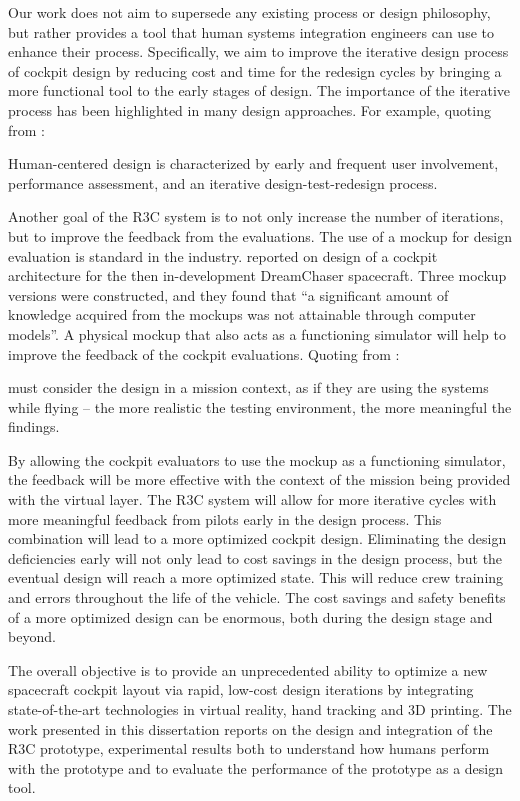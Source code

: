 Our work does not aim to supersede any existing process or design philosophy, but rather provides a tool that human systems integration engineers can use to enhance their process.
Specifically, we aim to improve the iterative design process of cockpit design by reducing cost and time for the redesign cycles by bringing a more functional tool to the early stages of design.
The importance of the iterative process has been highlighted in many design approaches.
For example, quoting from \citet{nasa_nasa_2015}:
\begin{displayquote}
Human-centered design \textelp is characterized by early and frequent user involvement, performance assessment, and an iterative design-test-redesign process.
\end{displayquote}
Another goal of the R3C system is to not only increase the number of iterations, but to improve the feedback from the evaluations.
The use of a mockup for design evaluation is standard in the industry.
\citet{zea_development_2012} reported on design of a cockpit architecture for the then in-development DreamChaser spacecraft.
Three mockup versions were constructed, and they found that ``a significant amount of knowledge acquired from the mockups was not attainable through computer models''.
A physical mockup that also acts as a functioning simulator will help to improve the feedback of the cockpit evaluations.
Quoting from \citet{sexton_cockpitcrew_1988}:
\begin{displayquote}
 must consider the design in a mission context, as if they are using the systems while flying -- the more realistic the testing environment, the more meaningful the findings.
\end{displayquote}
By allowing the cockpit evaluators to use the mockup as a functioning simulator, the feedback will be more effective with the context of the mission being provided with the virtual layer.
The R3C system will allow for more iterative cycles with more meaningful feedback from pilots early in the design process.
This combination will lead to a more optimized cockpit design.
Eliminating the design deficiencies early will not only lead to cost savings in the design process, but the eventual design will reach a more optimized state.
This will reduce crew training and errors throughout the life of the vehicle.
The cost savings and safety benefits of a more optimized design can be enormous, both during the design stage and beyond.

The overall objective is to provide an unprecedented ability to optimize a new spacecraft cockpit layout via rapid, low-cost design iterations by integrating state-of-the-art technologies in virtual reality, hand tracking and 3D printing.
The work presented in this dissertation reports on the design and integration of the R3C prototype, experimental results both to understand how humans perform with the prototype and to evaluate the performance of the prototype as a design tool.

